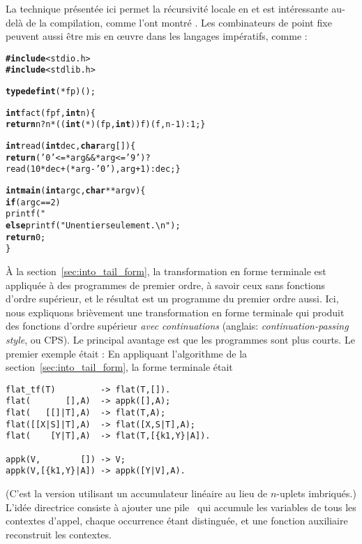 La technique présentée ici permet la récursivité locale en \Erlang et
est intéressante au-delà de la compilation, comme l'ont montré
\cite{GoldbergWiener_2009}. Les combinateurs de point fixe peuvent
aussi être mis en œuvre dans les langages impératifs, comme
\Clang:
\begin{alltt}
\textbf{#include}<stdio.h>
\textbf{#include}<stdlib.h>

\textbf{typedef int} (*fp)();

\textbf{int} fact(fp f, \textbf{int} n) \{
  \textbf{return} n? n * ((\textbf{int} (*)(fp,\textbf{int}))f)(f,n-1) : 1; \}

\textbf{int} read(\textbf{int} dec, \textbf{char} arg[]) \{
  \textbf{return} ('0' <= *arg && *arg <= '9')?
         read(10*dec+(*arg - '0'),arg+1) : dec; \}

\textbf{int main}(\textbf{int} argc, \textbf{char}** argv) \{
  \textbf{if} (argc == 2)
     printf("%u\textbackslash{n}",fact(&fact,read(0,argv[1])));
  \textbf{else} printf("Un entier seulement.\textbackslash{n}");
  \textbf{return} 0;
\}
\end{alltt}


À la section~\ref{sec:into_tail_form}, la transformation en forme
terminale est appliquée à des programmes de premier ordre, à savoir
ceux sans fonctions d'ordre supérieur, et le résultat est un programme
du premier ordre aussi. Ici, nous expliquons brièvement une
transformation en forme terminale qui produit des fonctions d'ordre
supérieur \emph{avec continuations} (anglais:
\emph{continuation-passing style}, ou CPS). Le principal avantage est
que les programmes sont plus courts. Le premier exemple était
:  En appliquant l'algorithme
de la section~\ref{sec:into_tail_form}, la forme terminale était
\begin{verbatim}
flat_tf(T)         -> flat(T,[]).
flat(       [],A)  -> appk([],A);
flat(   [[]|T],A)  -> flat(T,A);
flat([[X|S]|T],A)  -> flat([X,S|T],A);
flat(    [Y|T],A)  -> flat(T,[{k1,Y}|A]).

appk(V,        []) -> V;
appk(V,[{k1,Y}|A]) -> appk([Y|V],A).
\end{verbatim}
(C'est la version utilisant un accumulateur linéaire au lieu de
\(n\)-uplets imbriqués.) L'idée directrice consiste à ajouter une
pile~ qui accumule les variables de tous les contextes
d'appel, chaque occurrence étant distinguée, et une fonction
auxiliaire  reconstruit les contextes.


